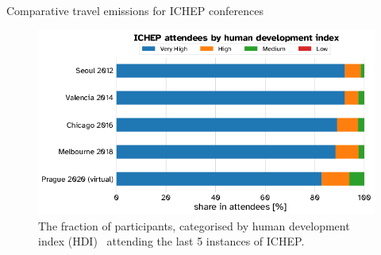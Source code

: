 \documentclass[../SustainableHEP.tex]{subfiles}
\begin{document}
\begin{casestudy}{Comparative travel emissions for ICHEP conferences}

\begin{figure}
    \centering
    \captionsetup{type=figure}
    \includegraphics[width=1.\textwidth]{Sections/Figs/Travel/ICHEP_attendees.png}
    \caption[ICHEP participants by development index]%
        {The fraction of participants, categorised by human development index (HDI)~\cite{hdiref} attending the last 5 instances of ICHEP.\label{fig:DevelopmentIndex}}
\end{figure}


\end{casestudy}

\end{document}

